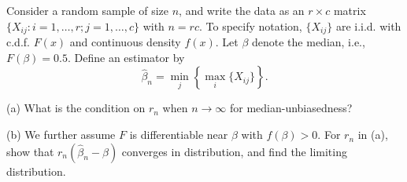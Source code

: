 \begin{exercise}\label{probability:2022:5}
Consider a random sample of size $n$, and write the data as an $r \times c$ matrix $\{X_{ij}: i = 1, \ldots, r; j = 1, \ldots, c\}$ with $n = rc$. To specify notation, $\{X_{ij}\}$ are i.i.d. with c.d.f. $F(x)$ and continuous density $f(x)$. Let $\beta$ denote the median, i.e., $F(\beta) = 0.5$. Define an estimator by
\[
\hat{\beta}_n = \min_j \left\{\max_i \{X_{ij}\}\right\}.
\]

(a) What is the condition on $r_n$ when $n \to \infty$ for median-unbiasedness?

(b) We further assume $F$ is differentiable near $\beta$ with $f(\beta) > 0$. For $r_n$ in (a), show that $r_n(\hat{\beta}_n - \beta)$ converges in distribution, and find the limiting distribution.
\end{exercise}

